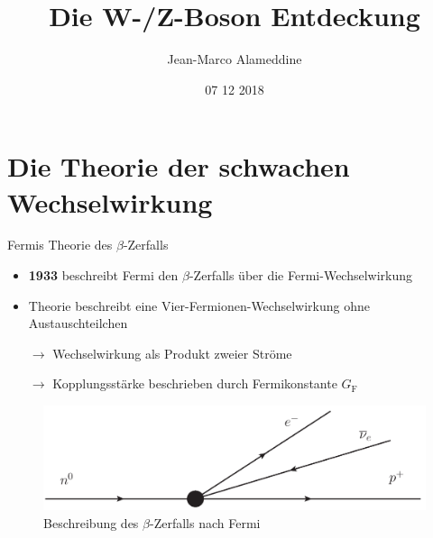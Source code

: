 \documentclass[aspectratio=1610, professionalfonts, 10pt]{beamer}
\title{Die W-/Z-Boson Entdeckung}
\author{Jean-Marco Alameddine}
\institute{TU Dortmund \\ Fakultät Physik}
\date{07 12 2018}
\begin{document}

\begin{frame}
	\maketitle %
\end{frame}

\section{Die Theorie der schwachen Wechselwirkung}

\begin{frame}{Fermis Theorie des $\beta$-Zerfalls}
			\begin{itemize}
				\setlength\itemsep{0.5em}
				\item \textbf{1933} beschreibt Fermi den $\beta$-Zerfalls über die Fermi-Wechselwirkung
				\item Theorie beschreibt eine Vier-Fermionen-Wechselwirkung ohne Austauschteilchen
				\item [$\rightarrow$] Wechselwirkung als Produkt zweier Ströme
				\item [$\rightarrow$] Kopplungsstärke beschrieben durch Fermikonstante $G_\text{F}$
			\end{itemize}

			\begin{figure}
	  			\centering
				\includegraphics[width=0.9\linewidth]{Images/fourFermi_BetaDecay.png}
	  			\caption{Beschreibung des $\beta$-Zerfalls nach Fermi \cite{fermi_four}}
	  			\label{fig:fermi}
			\end{figure}
\end{frame}
\end{document}
